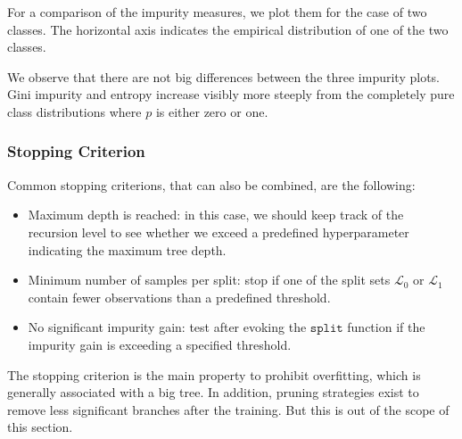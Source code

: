 \documentclass[letterpaper,10pt,english]{jupyterBook}
\begin{document}
\sphinxAtStartPar
For a comparison of the impurity measures, we plot them for the case of two classes. The horizontal axis indicates the empirical distribution of one of the two classes.
\begin{center}\end{center}
\sphinxAtStartPar
We observe that there are not big differences between the three impurity plots. Gini impurity and entropy increase visibly more steeply from the completely pure class distributions where \(p\) is either zero or one.


\subsubsection{Stopping Criterion}
\label{\detokenize{classification_decision_trees:stopping-criterion}}
\sphinxAtStartPar
Common stopping criterions, that can also be combined, are the following:
\begin{itemize}
\item {} 
\sphinxAtStartPar
Maximum depth is reached: in this case, we should keep track of the recursion level to see whether we exceed a predefined hyperparameter indicating the maximum tree depth.

\item {} 
\sphinxAtStartPar
Minimum number of samples per split: stop if one of the split sets \(\mathcal{L}_0\) or \(\mathcal{L}_1\) contain fewer observations than a predefined threshold.

\item {} 
\sphinxAtStartPar
No significant impurity gain: test after evoking the \(\mathtt{split}\) function if the impurity gain is exceeding a specified threshold.

\end{itemize}

\sphinxAtStartPar
The stopping criterion is the main property to prohibit overfitting, which is generally associated with a big tree. In addition, pruning strategies exist to remove less significant branches after the training. But this is out of the scope of this section.
\end{document}
